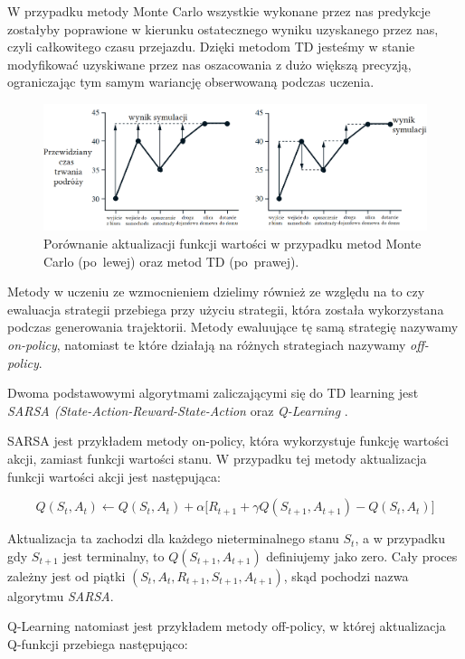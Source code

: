 \documentclass[licencjacka]{pracamgr}
\begin{document}
W przypadku metody Monte Carlo wszystkie wykonane przez nas predykcje zostałyby poprawione w kierunku ostatecznego wyniku uzyskanego przez nas, czyli całkowitego czasu przejazdu. Dzięki metodom TD jesteśmy w stanie modyfikować uzyskiwane przez nas oszacowania z dużo większą precyzją, ograniczając tym samym wariancję obserwowaną podczas uczenia.

\begin{figure}[ht]
  \centering
  \includegraphics[width=1.0\textwidth]{mc_td}
  \caption{Porównanie aktualizacji funkcji wartości w przypadku metod Monte Carlo (po~lewej) oraz metod TD (po~prawej). \cite{Sutton}}
\end{figure}

Metody w uczeniu ze wzmocnieniem dzielimy również ze względu na to czy ewaluacja strategii przebiega przy użyciu strategii, która została wykorzystana podczas generowania trajektorii. Metody ewaluujące tę samą strategię nazywamy \emph{on-policy}, natomiast te które działają na różnych strategiach nazywamy \emph{off-policy}.

Dwoma podstawowymi algorytmami zaliczającymi się do TD learning jest \emph{SARSA (State-Action-Reward-State-Action} \cite{SARSA} oraz \emph{Q-Learning} \cite{Q-learning}.

SARSA jest przykładem metody on-policy, która wykorzystuje funkcję wartości akcji, zamiast funkcji wartości stanu. W przypadku tej metody aktualizacja funkcji wartości akcji jest następująca:

$$ Q(S_t, A_t) \leftarrow Q(S_t, A_t) + \alpha \big[R_{t+1} + \gamma Q(S_{t+1}, A_{t+1}) - Q(S_t, A_t) \big] $$

Aktualizacja ta zachodzi dla każdego nieterminalnego stanu $S_t$, a w przypadku gdy $S_{t+1}$ jest terminalny, to $ Q(S_{t+1}, A_{t+1}) $ definiujemy jako zero. Cały proces zależny jest od piątki $ (S_t, A_t, R_{t+1}, S_{t+1}, A_{t+1}) $, skąd pochodzi nazwa algorytmu \emph{SARSA}.

Q-Learning natomiast jest przykładem metody off-policy, w której aktualizacja Q-funkcji przebiega następująco:
\end{document}
